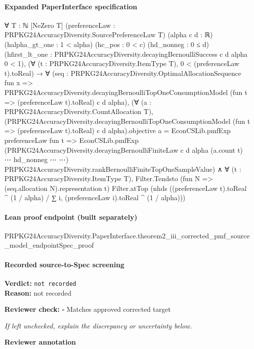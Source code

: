 \documentclass[10pt]{article}
\newcommand{\reviewerbox}{%
  \par\noindent\fbox{\parbox{0.96\linewidth}{\rule{0pt}{0.38in}}}\par
}
\newcommand{\reviewmatch}[1]{%
  \par\noindent\textbf{Reviewer check:} $\square$\; #1\par
  \noindent\emph{If left unchecked, explain the discrepancy or uncertainty below.}\par
}
\begin{document}
\paragraph{Expanded PaperInterface specification}
\begin{ReviewVerbatim}
∀ {T : ℕ} [NeZero T] (preferenceLaw : PRPKG24AccuracyDiversity.SourcePreferenceLaw T) (alpha c d : ℝ)
  (halpha_gt_one : 1 < alpha) (hc_pos : 0 < c) (hd_nonneg : 0 ≤ d)
  (hfirst_lt_one : PRPKG24AccuracyDiversity.decayingBernoulliSuccess c d alpha 0 < 1),
  (∀ (t : PRPKG24AccuracyDiversity.ItemType T), 0 < (preferenceLaw t).toReal) →
    ∀
      (seq :
        PRPKG24AccuracyDiversity.OptimalAllocationSequence fun x =>
          PRPKG24AccuracyDiversity.decayingBernoulliTopOneConsumptionModel (fun t => (preferenceLaw t).toReal) c d
            alpha),
      (∀ (a : PRPKG24AccuracyDiversity.CountAllocation T),
          (PRPKG24AccuracyDiversity.decayingBernoulliTopOneConsumptionModel (fun t => (preferenceLaw t).toReal) c d
                  alpha).objective
              a =
            EconCSLib.pmfExp preferenceLaw fun t =>
              EconCSLib.pmfExp
                (PRPKG24AccuracyDiversity.decayingBernoulliFiniteLaw c d alpha (a.count t) ⋯ hd_nonneg ⋯ ⋯)
                PRPKG24AccuracyDiversity.rankBernoulliFiniteTopOneSampleValue) ∧
        ∀ (t : PRPKG24AccuracyDiversity.ItemType T),
          Filter.Tendsto (fun N => (seq.allocation N).representation t) Filter.atTop
            (nhds ((preferenceLaw t).toReal ^ (1 / alpha) / ∑ i, (preferenceLaw i).toReal ^ (1 / alpha)))
\end{ReviewVerbatim}

\paragraph{Lean proof endpoint (built separately)}\begin{ReviewVerbatim}
PRPKG24AccuracyDiversity.PaperInterface.theorem2_iii_corrected_pmf_source_model_endpointSpec_proof
\end{ReviewVerbatim}

\paragraph{Recorded source-to-Spec screening}
\textbf{Verdict:} \texttt{not recorded}
\\
\textbf{Reason:} not recorded
\reviewmatch{Matches approved corrected target}
\noindent\textbf{Reviewer annotation}\par
\reviewerbox
\clearpage
\hypertarget{source-claim-49b00f2a87213781}{}
\end{document}
